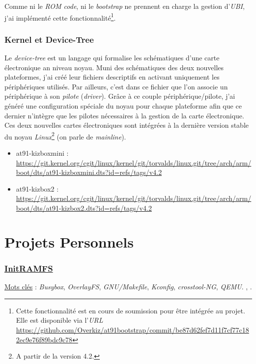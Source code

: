 \documentclass[a4paper]{article}
\begin{document}
Comme ni le \textit{ROM code}, ni le \textit{bootstrap} ne prennent en charge la gestion d'\textit{UBI}, j'ai implémenté cette fonctionnalité\footnote{Cette fonctionnalité est en cours de soumission pour être intégrée au projet. Elle est disponible via l'\textit{URL} \url{https://github.com/Overkiz/at91bootstrap/commit/be87d62fef7d11f7cf77c182ec9e76f89bdc9c78}}.

\section{Kernel et Device-Tree}

Le \textit{device-tree} est un langage qui formalise les schématiques d'une carte électronique an niveau noyau. Muni des schématiques des deux nouvelles plateformes, j'ai créé leur fichiers descriptifs en activant uniquement les périphériques utilisés. Par ailleurs, c'est dans ce fichier que l'on associe un périphérique à son \textit{pilote} (\textit{driver}). Grâce à ce couple périphérique/pilote, j'ai généré une configuration spéciale du noyau pour chaque plateforme afin que ce dernier n’intègre que les pilotes nécessaires à la gestion de la carte électronique.\\

Ces deux nouvelles cartes électroniques sont intégrées à la dernière version stable du noyau \textit{Linux}\footnote{A partir de la version 4.2.} (on parle de \textit{mainline}).
\begin{itemize}
\item at91-kizboxmini : \url{https://git.kernel.org/cgit/linux/kernel/git/torvalds/linux.git/tree/arch/arm/boot/dts/at91-kizboxmini.dts?id=refs/tags/v4.2}
\item at91-kizbox2 : \url{https://git.kernel.org/cgit/linux/kernel/git/torvalds/linux.git/tree/arch/arm/boot/dts/at91-kizbox2.dts?id=refs/tags/v4.2}
\end{itemize}
\clearpage

\part{Projets Personnels}

\section{\href{https://github.com/gazoo74/initramfs/}{InitRAMFS}}

\underline{Mots clés} : \textit{Busybox}, \textit{OverlayFS}, \textit{GNU/Makefile}, \textit{Kconfig}, \textit{crosstool-NG}, \textit{QEMU}. , \textit{}.\\
\end{document}
